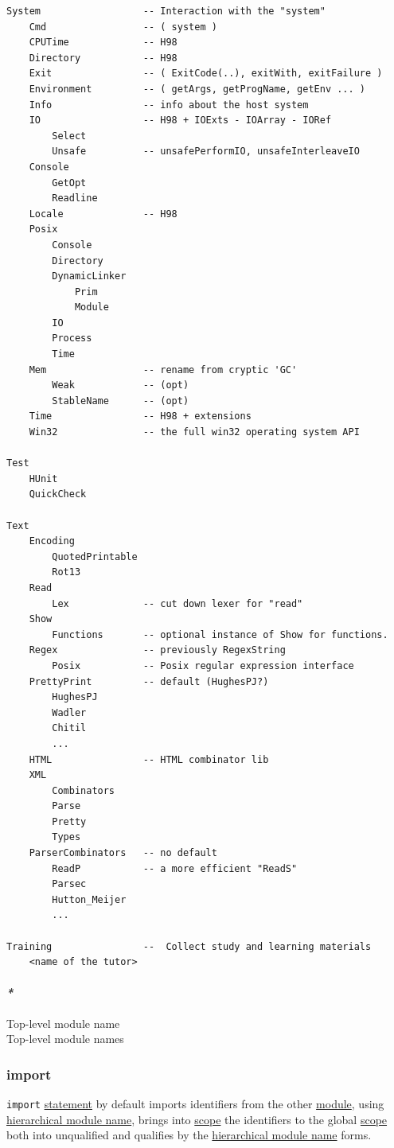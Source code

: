 \documentclass[11pt]{article}
\begin{document}
\begin{verbatim}
System                  -- Interaction with the "system"
    Cmd                 -- ( system )
    CPUTime             -- H98
    Directory           -- H98
    Exit                -- ( ExitCode(..), exitWith, exitFailure )
    Environment         -- ( getArgs, getProgName, getEnv ... )
    Info                -- info about the host system
    IO                  -- H98 + IOExts - IOArray - IORef
        Select
        Unsafe          -- unsafePerformIO, unsafeInterleaveIO
    Console
        GetOpt
        Readline
    Locale              -- H98
    Posix
        Console
        Directory
        DynamicLinker
            Prim
            Module
        IO
        Process
        Time
    Mem                 -- rename from cryptic 'GC'
        Weak            -- (opt)
        StableName      -- (opt)
    Time                -- H98 + extensions
    Win32               -- the full win32 operating system API

Test
    HUnit
    QuickCheck

Text
    Encoding
        QuotedPrintable
        Rot13
    Read
        Lex             -- cut down lexer for "read"
    Show
        Functions       -- optional instance of Show for functions.
    Regex               -- previously RegexString
        Posix           -- Posix regular expression interface
    PrettyPrint         -- default (HughesPJ?)
        HughesPJ
        Wadler
        Chitil
        ...
    HTML                -- HTML combinator lib
    XML
        Combinators
        Parse
        Pretty
        Types
    ParserCombinators   -- no default
        ReadP           -- a more efficient "ReadS"
        Parsec
        Hutton_Meijer
        ...

Training                --  Collect study and learning materials
    <name of the tutor>
\end{verbatim}

\paragraph{\emph{*}}
\label{sec:orgf1716af}
\label{org5859bc0}Top-level module name\\
\label{org13a28b0}Top-level module names\\

\subsubsection{\label{orge7bdadf}import}
\label{sec:org52f8ddb}
\texttt{import} \hyperref[org36313c0]{statement} by default imports identifiers from the other \hyperref[org5699463]{module}, using \hyperref[org5a7d1d2]{hierarchical module name}, brings into \hyperref[orgb3c0d1a]{scope} the identifiers to the global \hyperref[orgb3c0d1a]{scope} both into unqualified and qualifies by the \hyperref[org5a7d1d2]{hierarchical module name} forms.\\
\end{document}
